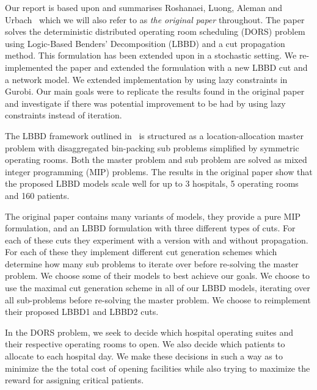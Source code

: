 Our report is based upon and summarises Roshanaei, Luong, Aleman and Urbach~\cite{roshanaei2017propagating} which we will also refer to as \textit{the original paper} throughout. The paper solves the deterministic distributed  operating room scheduling (DORS) problem using Logic-Based Benders' Decomposition (LBBD) and a cut propagation method. This formulation has been extended upon in a stochastic setting\cite{guo}. We re-implemented the paper and extended the formulation with a new LBBD cut and a network model. We extended implementation by using lazy constraints in Gurobi. Our main goals were to replicate the results found in the original paper and investigate if there was potential improvement to be had by using lazy constraints instead of iteration.

The LBBD framework outlined in~\cite{roshanaei2017propagating} is structured as a location-allocation master problem with disaggregated bin-packing sub problems simplified by symmetric operating rooms. Both the master problem and sub problem are solved as mixed integer programming (MIP) problems. The results in the original paper show that the proposed LBBD models scale well for up to 3 hospitals, 5 operating rooms and 160 patients.

The original paper contains many variants of models, they provide a pure MIP formulation, and an LBBD formulation with three different types of cuts. For each of these cuts they experiment with a version with and without propagation. For each of these they implement different cut generation schemes which determine how many sub problems to iterate over before re-solving the master problem. We choose some of their models to best achieve our goals. We choose to use the maximal cut generation scheme in all of our LBBD models, iterating over all sub-problems before re-solving the master problem. We choose to reimplement their proposed LBBD1 and LBBD2 cuts.

In the DORS problem, we seek to decide which hospital operating suites and their respective operating rooms to open. We also decide which patients to allocate to each hospital day. We make these decisions in such a way as to minimize the the total cost of opening facilities while also trying to maximize the reward for assigning critical patients\cite{roshanaei2017propagating}.